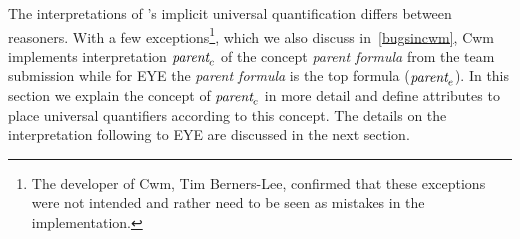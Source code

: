 The interpretations of \nthree's implicit universal quantification differs between reasoners. 
With a few exceptions\footnote{The developer of Cwm, Tim Berners-Lee, confirmed that these exceptions were not intended
and rather need to be seen as mistakes in the implementation.}, which we also discuss in~\ref{bugsincwm}, 
Cwm implements interpretation $\emph{parent}_c$ %
of the 
concept \emph{parent formula} from the \wwwc team submission while 
for EYE the \emph{parent formula} is the top formula ($\emph{parent}_e$). In this section we explain the concept of $\emph{parent}_c$ in more detail
and define attributes to place universal quantifiers according to this concept. 
The details on the interpretation following to EYE are discussed in the next section.
%
% 
% 

%
%
%


